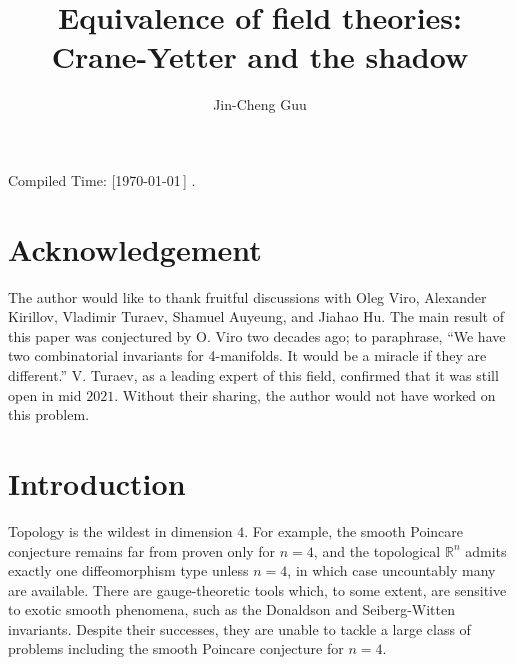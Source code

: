 \documentclass[12pt]{extarticle}
\title{Equivalence of field theories: Crane-Yetter and the shadow}
\author{Jin-Cheng Guu}
\date{}
\numberwithin{equation}{section} %
\theoremstyle{mystyle}
\begin{document}
\maketitle
\begin{flushright}
  \tiny{Compiled Time: [\today\,\DTMcurrenttime]} \quad\qquad.
\end{flushright}

\tableofcontents

\section*{Acknowledgement}

The author would like to thank fruitful discussions with Oleg
Viro, Alexander Kirillov, Vladimir Turaev, Shamuel Auyeung, and
Jiahao Hu. The main result of this paper was conjectured by O.
Viro two decades ago; to paraphrase, ``We have two combinatorial
invariants for 4-manifolds. It would be a miracle if they are
different.'' V. Turaev, as a leading expert of this field,
confirmed that it was still open in mid $2021$. Without their
sharing, the author would not have worked on this problem.

\section{Introduction}

Topology is the wildest in dimension $4$. For example, the smooth
Poincare conjecture remains far from proven only for $n = 4$, and
the topological $\mathbb{R}^{n}$ admits exactly one
diffeomorphism type unless $n=4$, in which case uncountably many
are available. There are gauge-theoretic tools which, to some
extent, are sensitive to exotic smooth phenomena, such as the
Donaldson and Seiberg-Witten invariants. Despite their successes,
they are unable to tackle a large class of problems including the
smooth Poincare conjecture for $n=4$.
\end{document}
